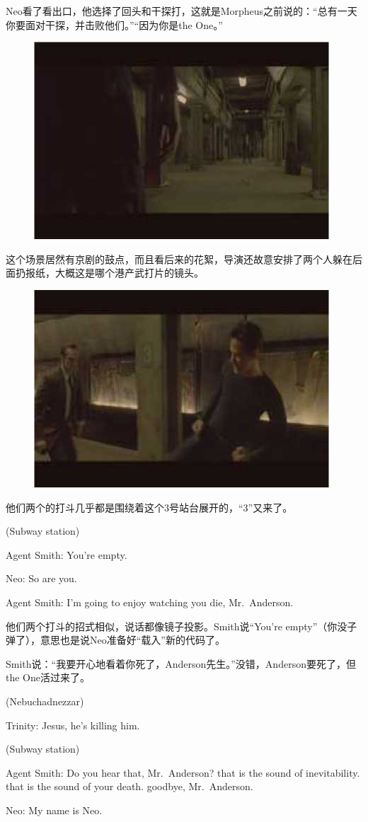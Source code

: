 \documentclass{ctexart}
\newenvironment{myquote}{\color{green} \setlength{\leftskip}{6em} \setlength{\rightskip}{4em} \setlength{\parindent}{-2em}}{\par}
\begin{document}
Neo看了看出口，他选择了回头和干探打，这就是Morpheus之前说的：“总有一天你要面对干探，并击败他们。”“因为你是the One。”

\begin{figure}[htb]
\centering
\includegraphics[width=0.5\linewidth]{fig/read_Matrix-72}
\end{figure}

这个场景居然有京剧的鼓点，而且看后来的花絮，导演还故意安排了两个人躲在后面扔报纸，大概这是哪个港产武打片的镜头。

\begin{figure}[htb]
\centering
\includegraphics[width=0.5\linewidth]{fig/read_Matrix-73}
\end{figure}

他们两个的打斗几乎都是围绕着这个3号站台展开的，“3”又来了。

\begin{myquote}
(Subway station)

Agent Smith: You're empty.

Neo: So are you.

Agent Smith: I'm going to enjoy watching you die, Mr.~Anderson.
\end{myquote}

他们两个打斗的招式相似，说话都像镜子投影。Smith说“You're empty”（你没子弹了），意思也是说Neo准备好“载入”新的代码了。

Smith说：“我要开心地看着你死了，Anderson先生。”没错，Anderson要死了，但the One活过来了。

\begin{myquote}
(Nebuchadnezzar)

Trinity: Jesus, he's killing him.

(Subway station)

Agent Smith: Do you hear that, Mr.~Anderson? that is the sound of inevitability. that is the sound of your death. goodbye, Mr.~Anderson.

Neo: My name is Neo.
\end{myquote}
\end{document}
